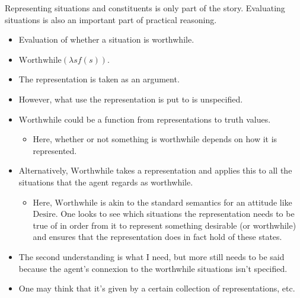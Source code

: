 \documentclass[10pt]{article}
\begin{document}









Representing situations and constituents is only part of the story.
Evaluating situations is also an important part of practical reasoning.

\begin{itemize}
\item Evaluation of whether a situation is worthwhile.
\item \(\text{Worthwhile}(\lambda s f(s))\).
\item The representation is taken as an argument.
\item However, what use the representation is put to is unspecified.
\item \(\text{Worthwhile}\) could be a function from representations to truth values.
  \begin{itemize}
  \item Here, whether or not something is worthwhile depends on how it is represented.
  \end{itemize}
\item Alternatively, \(\text{Worthwhile}\) takes a representation and applies this to all the situations that the agent regards as worthwhile.
  \begin{itemize}
  \item Here, \(\text{Worthwhile}\) is akin to the standard semantics for an attitude like \(\text{Desire}\).
    One looks to see which situations the representation needs to be true of in order from it to represent something desirable (or worthwhile) and ensures that the representation does in fact hold of these states.
  \end{itemize}
\item The second understanding is what I need, but more still needs to be said because the agent's connexion to the worthwhile situations isn't specified.
\item One may think that it's given by a certain collection of representations, etc.

\end{itemize}
\end{document}
